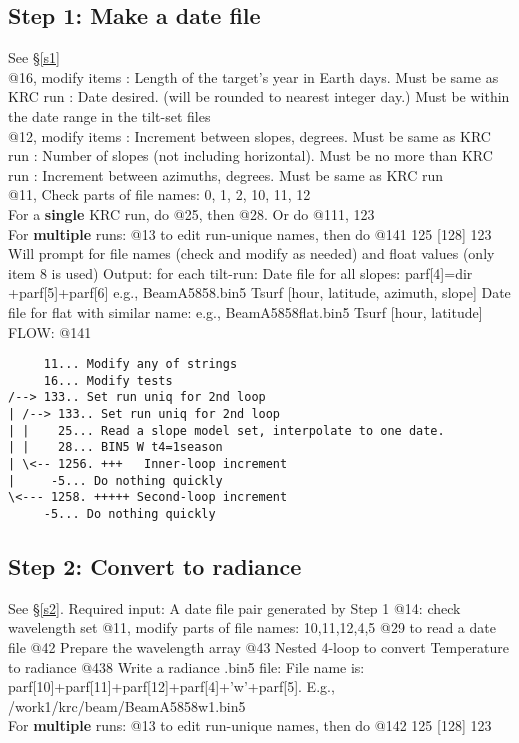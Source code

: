 \documentclass{article}
\begin{document}
\subsection{Step 1: Make a date file}
See \S \ref{s1} 
\\ @16, modify items 
: Length of the target's year in Earth days. Must be same as KRC run
: Date desired. (will be rounded to nearest integer day.) 
\qii Must be within the date range in the tilt-set files 
\\ @12,  modify items
: Increment between slopes, degrees. Must be same as KRC run
: Number of slopes (not including horizontal). Must be no more than KRC run 
: Increment between azimuths, degrees. Must be same as KRC run
\\ @11, Check parts of file names: 0, 1, 2, 10, 11, 12
\\ For a \textbf{single} KRC run, do @25, then @28. Or do @111, 123
\\ For \textbf{multiple} runs: @13 to edit run-unique names, then do @141 125 [128] 123
\qii  Will prompt for file names (check and modify as needed) and float values (only item 8 is used)
\qi Output: for each tilt-run: 
\qii Date file for all slopes: parf[4]=dir +parf[5]+parf[6] e.g., BeamA5858.bin5
\qiii Tsurf [hour, latitude, azimuth, slope]
\qii Date file for flat with similar name: e.g., BeamA5858flat.bin5
\qiii Tsurf [hour, latitude]
\\ FLOW: @141
\vspace{-3.mm} 
\begin{verbatim}
     11... Modify any of strings
     16... Modify tests
/--> 133.. Set run uniq for 2nd loop
| /--> 133.. Set run uniq for 2nd loop
| |    25... Read a slope model set, interpolate to one date.
| |    28... BIN5 W t4=1season
| \<-- 1256. +++   Inner-loop increment
|     -5... Do nothing quickly
\<--- 1258. +++++ Second-loop increment
     -5... Do nothing quickly
\end{verbatim}  

\subsection{Step 2: Convert to radiance}
See \S \ref{s2}. Required input: A date file pair generated by Step 1
\qi @14: check wavelength set
\qi @11, modify parts of file names:  10,11,12,4,5
\qi @29 to read a date file
\qi @42 Prepare the wavelength array 
\qi @43 Nested 4-loop to convert Temperature to radiance
\qi @438 Write a radiance .bin5 file:
\qii File name is: parf[10]+parf[11]+parf[12]+parf[4]+'w'+parf[5]. E.g., /work1/krc/beam/BeamA5858w1.bin5
\\ For \textbf{multiple} runs: @13 to edit run-unique names, then do @142 125 [128] 123
\end{document}
